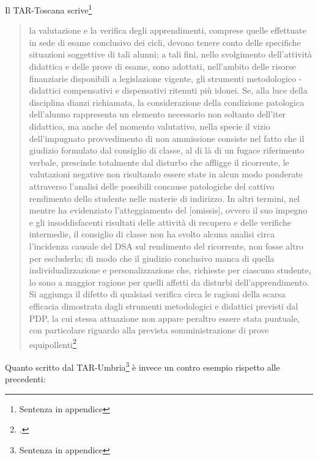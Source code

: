 Il TAR-Toscana scrive\footnote{Sentenza in appendice}
 \begin{quote}
 \mancatesto
 la valutazione e la verifica degli apprendimenti, comprese quelle effettuate in sede
 di esame conclusivo dei cicli, devono tenere conto delle specifiche situazioni soggettive di tali
 alunni; a tali fini, nello svolgimento dell'attività didattica e delle prove di esame, sono adottati,
 nell'ambito delle risorse finanziarie disponibili a legislazione vigente, gli strumenti metodologico -
 didattici compensativi e dispensativi ritenuti più idonei. Se, alla luce della disciplina dianzi
 richiamata, la considerazione della condizione patologica dell'alunno rappresenta un elemento
 necessario non soltanto dell'iter didattico, ma anche del momento valutativo, nella specie il vizio
 dell'impugnato provvedimento di non ammissione consiste nel fatto che il giudizio formulato dal
 consiglio di classe, al di là di un fugace riferimento verbale, prescinde totalmente dal disturbo che
 affligge il ricorrente, le valutazioni negative non risultando essere state in alcun modo ponderate
 attraverso l'analisi delle possibili concause patologiche del cattivo rendimento dello studente nelle
 materie di indirizzo. In altri termini, nel mentre ha evidenziato l'atteggiamento  del [omissis], ovvero il suo impegno  e gli
 insoddisfacenti risultati delle attività di recupero e delle verifiche intermedie, il consiglio di classe
 non ha svolto alcuna analisi circa l'incidenza causale del DSA sul rendimento del ricorrente, non
 fosse altro per escluderla; di modo che il giudizio conclusivo manca di quella individualizzazione e
 personalizzazione che, richieste per ciascuno studente, lo sono a maggior ragione per quelli affetti
 da disturbi dell'apprendimento.
 Si aggiunga il difetto di qualsiasi verifica circa le ragioni della scarsa efficacia dimostrata dagli
 strumenti metodologici e didattici previsti dal PDP, la cui stessa attuazione non appare peraltro
 essere stata puntuale, con particolare riguardo alla prevista somministrazione di prove equipollenti\footcite{tartoscana346}\mancatesto
 \end{quote}
 Quanto scritto dal TAR-Umbria\footnote{Sentenza in appendice} è invece un contro esempio rispetto alle precedenti:
